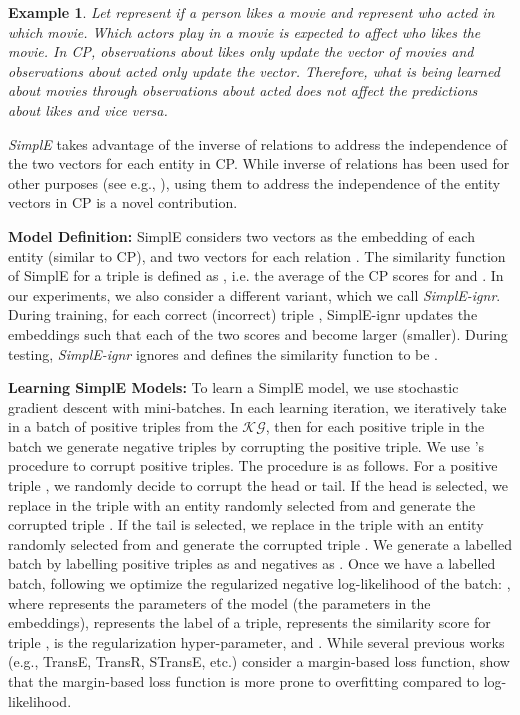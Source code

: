 \documentclass{article}
\newcommand{\KG}{\ensuremath{\mathcal{KG}}}
\newtheorem{exampl}{Example}
\newenvironment{example}{\begin{exampl}\em}{\end{exampl}}
\begin{document}
\begin{example}
Let  represent if a person  likes a movie  and  represent who acted in which movie. Which actors play in a movie is expected to affect who likes the movie. In CP, observations about \emph{likes} only update the  vector of movies and observations about \emph{acted} only update the  vector. Therefore, what is being learned about movies through observations about \emph{acted} does not affect the predictions about \emph{likes} and vice versa. 
\end{example}

\emph{SimplE} takes advantage of the inverse of relations to address the independence of the two vectors for each entity in CP. While inverse of relations has been used for other purposes (see e.g., \cite{lao2010relational,lin2015modeling,das2017go}), using them to address the independence of the entity vectors in CP is a novel contribution.

\textbf{Model Definition:} SimplE considers two vectors  as the embedding of each entity  (similar to CP), and two vectors  for each relation . The similarity function of SimplE for a triple  is defined as , i.e. the average of the CP scores for  and .
In our experiments, we also consider a different variant, which we call \emph{SimplE-ignr}. 
During training, for each correct (incorrect) triple , SimplE-ignr updates the embeddings such that each of the two scores  and  become larger (smaller).
During testing, \emph{SimplE-ignr} ignores  and defines the similarity function to be . 

\textbf{Learning SimplE Models:} To learn a SimplE model, we use stochastic gradient descent with mini-batches. In each learning iteration, we iteratively take in a batch of positive triples from the \KG, then for each positive triple in the batch we generate  negative triples by corrupting the positive triple. We use \citet{bordes2013translating}'s procedure to corrupt positive triples. The procedure is as follows. For a positive triple , we randomly decide to corrupt the head or tail. If the head is selected, we replace  in the triple with an entity  randomly selected from  and generate the corrupted triple . If the tail is selected, we replace  in the triple with an entity  randomly selected from  and generate the corrupted triple . We generate a labelled batch  by labelling positive triples as  and negatives as .
Once we have a labelled batch, following \cite{trouillon2016complex} we optimize the  regularized negative log-likelihood of the batch:
, 
where  represents the parameters of the model (the parameters in the embeddings),  represents the label of a triple,  represents the similarity score for triple ,  is the regularization hyper-parameter, and . While several previous works (e.g., TransE, TransR, STransE, etc.) consider a margin-based loss function, \citet{trouillon2017complex} show that the margin-based loss function is more prone to overfitting compared to log-likelihood.
\end{document}

